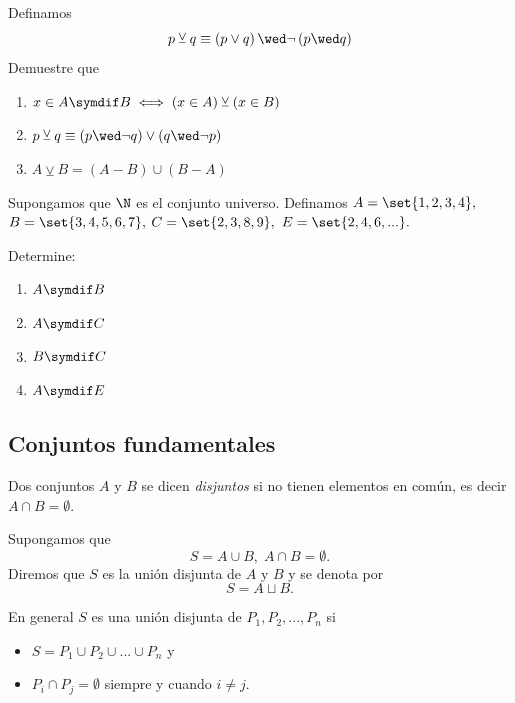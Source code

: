 \begin{problema}
Definamos $$p\veebar q \equiv \left( p \vee q \right) \wed \neg\left( p \wed q \right)$$
Demuestre que 
\begin{enumerate}
\item $ \displaystyle
x \in A\symdif B \iff \left( x \in A \right) \veebar \left( x \in B  \right)
$ 
\item $\displaystyle p\veebar q \equiv \left( p \wed \neg q \right) \vee \left( q \wed \neg p \right)$ 
\item $\displaystyle A \veebar B = \left( A \minus B \right) \cup \left( B \minus A \right)$
\end{enumerate}

\end{problema}




\begin{problema}
\label{lip:exmp:1.5}
Supongamos que $\N$ es el conjunto universo. Definamos $A=\set{1,2,3,4},$ $B=\set{3,4,5,6,7},$ $C=\set{2,3,8,9},$ $E=\set{2,4,6,...}.$

Determine:
\begin{enumerate}
\item $A \symdif B$ 
\item $A \symdif C$ 
\item $B \symdif C$ 
\item $A \symdif E$
\end{enumerate}
\end{problema}



\subsection{Conjuntos fundamentales}


Dos conjuntos $A$ y $B$ se dicen \emph{disjuntos} si no tienen elementos en común, es decir $A\cap B=\emptyset$.


Supongamos que 
$$
S=A\cup B, \; A\cap B=\emptyset.
$$  Diremos que $S$ es la unión disjunta de $A$ y $B$ y se denota por $$S=A \sqcup B.$$ 




En general $S$ es una unión disjunta de $P_{1}, P_{2},...,P_{n}$ si 
\begin{itemize}
\item $\displaystyle S=P_{1}\cup P_{2}\cup...\cup P_{n}$ y
\item $P_{i}\cap P_{j}=\emptyset$ siempre y cuando $i\neq j.$
\end{itemize}


